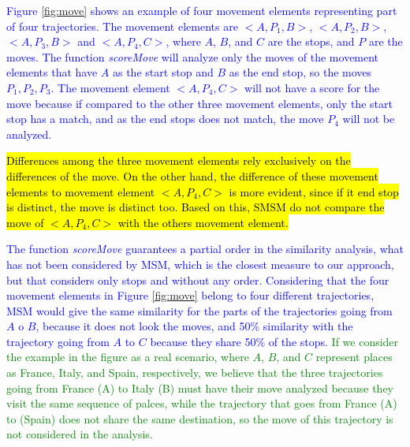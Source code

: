 \documentclass[12pt]{article}
\begin{document}
\textcolor{blue}{Figure \ref{fig:move} shows an example of four movement elements representing part of four trajectories. The movement elements are $<A, P_1, B>$, $<A, P_2, B>$, $<A, P_3, B>$ and $<A, P_4, C>$, where $A$, $B$, and $C$ are the stops, and $P$ are the moves. The function \emph{scoreMove} will analyze only the moves of the movement elements that have $A$ as the start stop and $B$ as the end stop, so the moves $P_1, P_2, P_3$. 
The movement element $<A, P_4, C>$ will not have a score for the move because if compared to the other three movement elements, only the start stop has a match, and as the end stops does not match, the move $P_4$ will not be analyzed.}


\hl{Differences among the three movement elements rely exclusively on the differences of the move. On the other hand, the difference of these movement elements to movement element $<A, P_4, C>$ is more evident, since if it end stop is distinct, the move is distinct too. Based on this, SMSM do not compare the move of $<A, P_4, C>$ with the others movement element.}

\textcolor{blue}{The function \emph{scoreMove} guarantees a partial order in the similarity analysis, what has not been considered by MSM, which is the closest measure to our approach, but that considers only stops and without any order. Considering that the four movement elements in Figure \ref{fig:move} belong to four different trajectories, MSM would give the same similarity for the parts of the trajectories going from $A$ o $B$, because it does not look the moves, and 50\% similarity with the trajectory going from $A$ to $C$ because they share 50\% of the stops.
}\textcolor{green}{If we consider the example in the figure as a real scenario, where $A$, $B$, and $C$ represent  places as France, Italy, and Spain, respectively, we believe that the three trajectories going from France (A) to Italy (B) must have their move analyzed because they visit the same sequence of palces, while the trajectory that goes from France (A) to (Spain) does not share the same destination, so the move of this trajectory is not considered in the analysis.}
\end{document}
